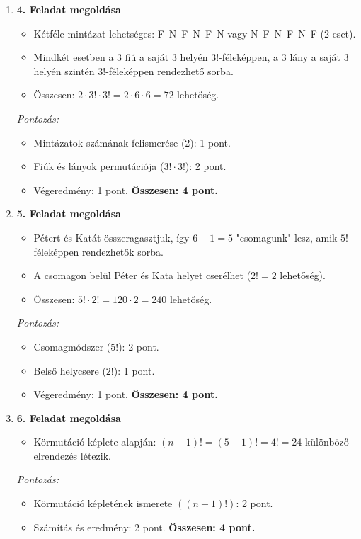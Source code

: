 \documentclass[12pt,a4paper]{article}
\begin{document}
\begin{enumerate}
    \vspace{0.3cm}

    \item \textbf{4. Feladat megoldása}
    \begin{itemize}
        \item Kétféle mintázat lehetséges: F--N--F--N--F--N vagy N--F--N--F--N--F (2 eset).
        \item Mindkét esetben a 3 fiú a saját 3 helyén $3!$-féleképpen, a 3 lány a saját 3 helyén szintén $3!$-féleképpen rendezhető sorba.
        \item Összesen: $2 \cdot 3! \cdot 3! = 2 \cdot 6 \cdot 6 = 72$ lehetőség.
    \end{itemize}
    \emph{Pontozás:}
    \begin{itemize}
        \item Mintázatok számának felismerése (2): 1 pont.
        \item Fiúk és lányok permutációja ($3! \cdot 3!$): 2 pont.
        \item Végeredmény: 1 pont.
        \textbf{Összesen: 4 pont.}
    \end{itemize}

    \vspace{0.3cm}

    \item \textbf{5. Feladat megoldása}
    \begin{itemize}
        \item Pétert és Katát összeragasztjuk, így $6-1 = 5$ "csomagunk" lesz, amik $5!$-féleképpen rendezhetők sorba.
        \item A csomagon belül Péter és Kata helyet cserélhet ($2! = 2$ lehetőség).
        \item Összesen: $5! \cdot 2! = 120 \cdot 2 = 240$ lehetőség.
    \end{itemize}
    \emph{Pontozás:}
    \begin{itemize}
        \item Csomagmódszer ($5!$): 2 pont.
        \item Belső helycsere ($2!$): 1 pont.
        \item Végeredmény: 1 pont.
        \textbf{Összesen: 4 pont.}
    \end{itemize}

    \vspace{0.3cm}

    \item \textbf{6. Feladat megoldása}
    \begin{itemize}
        \item Körmutáció képlete alapján: $(n-1)! = (5-1)! = 4! = 24$ különböző elrendezés létezik.
    \end{itemize}
    \emph{Pontozás:}
    \begin{itemize}
        \item Körmutáció képletének ismerete $((n-1)!)$: 2 pont.
        \item Számítás és eredmény: 2 pont.
        \textbf{Összesen: 4 pont.}
    \end{itemize}


\end{enumerate}
\end{document}
